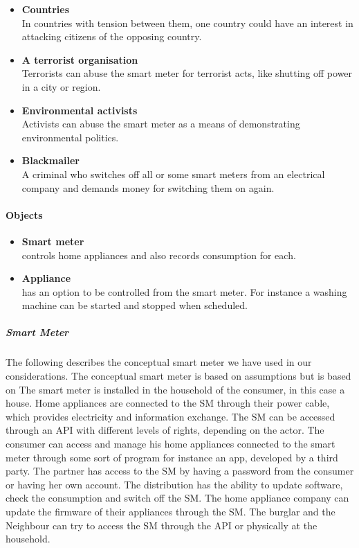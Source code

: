 \begin{itemize}
\item \textbf{Countries}\\ In countries with tension between them, one country could have an interest in attacking citizens of the opposing country.
\item \textbf{A terrorist organisation}\\ Terrorists can abuse the smart meter for terrorist acts, like shutting off power in a city or region.
\item \textbf{Environmental activists}\\ Activists can abuse the smart meter as a means of demonstrating environmental politics.
\item \textbf{Blackmailer}\\ A criminal who switches off all or some smart meters from an electrical company and demands money for switching them on again.
\end{itemize}

\paragraph{Objects}
\begin{itemize}
\item \textbf{Smart meter}\\ controls home appliances and also records consumption for each.
\item \textbf{Appliance}\\ has an option to be controlled from the smart meter. For instance a washing machine can be started and stopped when scheduled.
\end{itemize}

\subparagraph{Smart Meter}
The following describes the conceptual smart meter we have used in our considerations.
The conceptual smart meter is based on assumptions but is based on 
The smart meter is installed in the household of the consumer, in this case a house.
Home appliances are connected to the SM through their power cable, which provides electricity and information exchange.
The SM can be accessed through an API with different levels of rights, depending on the actor.
The consumer can access and manage his home appliances connected to the smart meter through some sort of program for instance an app, developed by a third party.
The partner has access to the SM by having a password from the consumer or having her own account.
The distribution has the ability to update software, check the consumption and switch off the SM.
The home appliance company can update the firmware of their appliances through the SM.
The burglar and the Neighbour can try to access the SM through the API or physically at the household.
